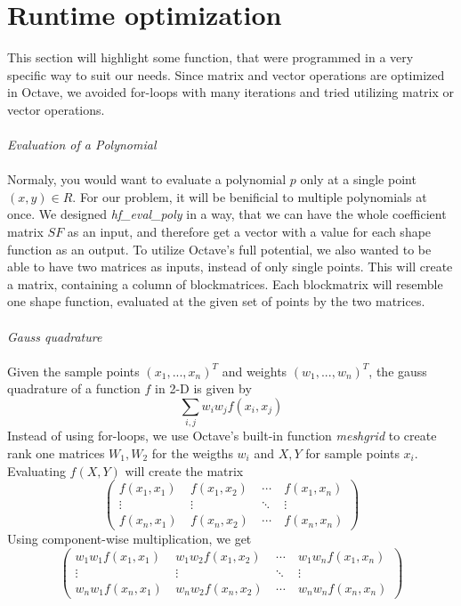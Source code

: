 \section{Runtime optimization}
This section will highlight some function, that were programmed in a very specific way to suit our needs. Since matrix and vector operations are optimized in Octave, we avoided for-loops with many iterations and tried utilizing matrix or vector operations.\\ \\
\textit{Evaluation of a Polynomial}\\ \\
Normaly, you would want to evaluate a polynomial $p$ only at a single point $(x,y)\in\!R$. For our problem, it will be benificial to multiple polynomials at once. We designed \textit{hf\_eval\_poly} in a way, that we can have the whole coefficient matrix $SF$ as an input, and therefore get a vector with a value for each shape function as an output. To utilize Octave's full potential, we also wanted to be able to have two matrices as inputs, instead of only single points. This will create a matrix, containing a column of blockmatrices. Each blockmatrix will resemble one shape function, evaluated at the given set of points by the two matrices.\\ \\
\textit{Gauss quadrature}\\ \\
Given the sample points $(x_1,...,x_n)^T$ and weights $(w_1,...,w_n)^T$, the gauss quadrature of a function $f$ in 2-D is given by
\[\sum_{i,j} w_i w_j f(x_i,x_j)\]
Instead of using for-loops, we use Octave's built-in function \textit{meshgrid} to create rank one matrices $W_1,W_2$ for the weigths $w_i$ and $X,Y$ for sample points $x_i$. Evaluating $f(X,Y)$ will create the matrix 
\[\begin{pmatrix} f(x_1,x_1) &\ f(x_1,x_2) &\ \cdots &\ f(x_1,x_n) \\
\vdots &\ \vdots &\ \ddots &\ \vdots \\ 
f(x_n,x_1) &\ f(x_n,x_2) &\ \cdots &\ f(x_n,x_n) \end{pmatrix} \]
Using component-wise multiplication, we get 
\[\begin{pmatrix} w_1 w_ 1f(x_1,x_1) &\ w_1 w_2 f(x_1,x_2) &\ \cdots &\ w_1 w_n f(x_1,x_n) \\
\vdots &\ \vdots &\ \ddots &\ \vdots \\ 
w_n w_1 f(x_n,x_1) &\ w_n w_2 f(x_n,x_2) &\ \cdots &\ w_n w_n f(x_n,x_n) \end{pmatrix} \]
